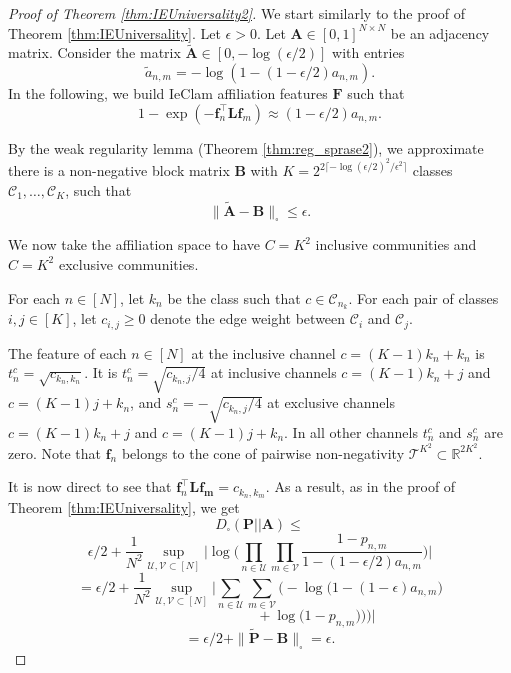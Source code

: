 \documentclass{article}
\theoremstyle{plain}
\theoremstyle{definition}
\theoremstyle{remark}
\begin{document}
\begin{proof}[Proof of Theorem \ref{thm:IEUniversality2}]

We start similarly to the proof of Theorem \ref{thm:IEUniversality}. Let $\epsilon>0$. Let $\mathbf{A}\in[0,1]^{N\times N}$ be an adjacency matrix. 
Consider the matrix  $\tilde{\mathbf{A}}\in[0,-\log(\epsilon/2)]$ with entries
\[\tilde{a}_{n,m}=-\log(1-(1-\epsilon/2)a_{n,m}).\]
In the following, we build IeClam affiliation features $\mathbf{F}$  such that
\[1-\exp(-\mathbf{f}_n^{\top}\mathbf{L}\mathbf{f}_m)\approx (1-\epsilon/2)a_{n,m}.\]

By the weak regularity lemma (Theorem \ref{thm:reg_sprase2}), we approximate there is a non-negative block matrix $\mathbf{B}$ with $K=2^{2\lceil -\log(\epsilon/2)^2/\epsilon^2\rceil}$ classes $\mathcal{C}_1,\ldots,\mathcal{C}_K$, such that
\[\|\tilde{\mathbf{A}}-\mathbf{B}\|_{\square} \leq \epsilon.\]

We now take the affiliation space to have $C=K^2$ inclusive communities  and $C=K^2$ exclusive communities.

For each $n\in[N]$, let $k_n$ be the class such that $c\in\mathcal{C}_{n_k}$.  For each pair of classes $i,j\in[K]$, let $c_{i,j}\geq 0$ denote the edge weight between $\mathcal{C}_i$ and $\mathcal{C}_j$.



The feature of each $n\in[N]$ at the inclusive channel $c=(K-1)k_n+k_n$ is $t_n^c=\sqrt{c_{k_n,k_n}}$. It is $t_n^c=\sqrt{c_{k_n,j}/4}$ at inclusive channels $c=(K-1)k_n+j$ and $c=(K-1)j+k_n$, and $s_n^c=-\sqrt{c_{k_n,j}/4}$ at exclusive channels $c=(K-1)k_n+j$ and $c=(K-1)j+k_n$. In all other channels $t^c_n$ and $s^c_n$ are zero. Note that $\mathbf{f}_n$ belongs to the cone of pairwise non-negativity $\mathcal{T}^{K^2}\subset \mathbb{R}^{2K^2}$.

It is now direct to see that  $\mathbf{f}_n^\top\mathbf{L}\mathbf{f_m}=c_{k_n,k_m}$.  As a result, as in the proof of Theorem \ref{thm:IEUniversality}, we get
{\color{orange}
\[D_{\square}(\mathbf{P}||\mathbf{A}) \leq \]
\[\epsilon/2+\frac{1}{N^2}\sup_{\mathcal{U},\mathcal{V}\subset[N]}\Big|\log\Big(\prod_{n\in \mathcal{U}}\prod_{m\in \mathcal{V}}
\frac{1-p_{n,m}}{1-(1-\epsilon/2)a_{n,m}}\Big)\Big|\]
\[ =
\epsilon/2+\frac{1}{N^2}\sup_{\mathcal{U},\mathcal{V}\subset[N]}\Big|\sum_{n\in \mathcal{U}}\sum_{m\in \mathcal{V}}\Big(-\log\big(1-(1-\epsilon)a_{n,m}\big) \]
\[\quad \quad \quad \quad\quad \quad \quad \quad + \log\big(1-p_{n,m})\big)\Big)\Big|\]
\[=\epsilon/2 + \| \tilde{\mathbf{P}}-\mathbf{B} \|_{\square} = \epsilon. \]
}


\end{proof}
\end{document}
